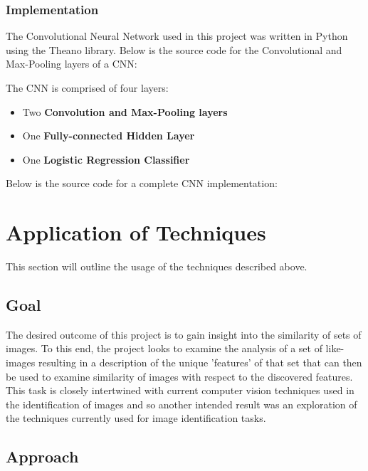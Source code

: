 \documentclass[12pt, titlepage]{article}
\begin{document}
  \subsubsection{Implementation}
  
  The Convolutional Neural Network used in this project was written in Python using the Theano library. Below is the source
  code for the Convolutional and Max-Pooling layers of a CNN:
  
  \vspace{3mm}
  The CNN is comprised of four layers:
  \begin{itemize}
    \item Two \textbf{Convolution and Max-Pooling layers}
    \item One \textbf{Fully-connected Hidden Layer}
    \item One \textbf{Logistic Regression Classifier}
  \end{itemize}
  Below is the source code for a complete CNN implementation:
  
  
\section{Application of Techniques}

This section will outline the usage of the techniques described above.

\subsection{Goal}

The desired outcome of this project is to gain insight into the similarity of sets of images. To this end, the project
looks to examine the analysis of a set of like-images resulting in a description of the unique 'features' of that set that
can then be used to examine similarity of images with respect to the discovered features. This task is closely intertwined
with current computer vision techniques used in the identification of images and so another intended result was an exploration
of the techniques currently used for image identification tasks.
  
\subsection{Approach}
\end{document}
